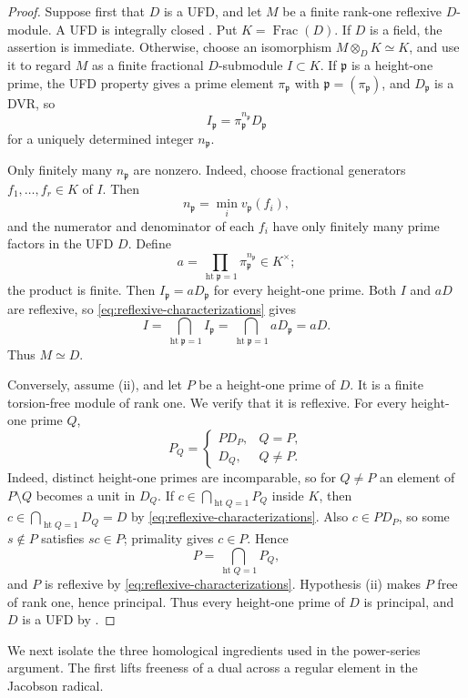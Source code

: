 \documentclass[reqno]{amsart}
\theoremstyle{plain}
\theoremstyle{definition}
\newcommand{\Frac}{\operatorname{Frac}}
\newcommand{\htp}{\operatorname{ht}}
\begin{document}
\begin{proof}
Suppose first that $D$ is a UFD, and let $M$ be a finite rank-one reflexive
$D$-module.  A UFD is integrally closed
\cite[p.~63]{AtiyahMacdonald}.  Put $K=\Frac(D)$.  If $D$ is a field, the
assertion is immediate.  Otherwise, choose
an isomorphism $M\otimes_DK\simeq K$, and use it
to regard $M$ as a finite fractional $D$-submodule $I\subset K$.  If
$\mathfrak p$ is a height-one prime, the UFD property gives a prime element
$\pi_{\mathfrak p}$ with $\mathfrak p=(\pi_{\mathfrak p})$, and
$D_{\mathfrak p}$ is a DVR, so
\[
  I_{\mathfrak p}
  =\pi_{\mathfrak p}^{n_{\mathfrak p}}D_{\mathfrak p}
\]
for a uniquely determined integer $n_{\mathfrak p}$.

Only finitely many $n_{\mathfrak p}$ are nonzero.  Indeed, choose fractional
generators $f_1,\ldots,f_r\in K$ of $I$.  Then
\[
  n_{\mathfrak p}=\min_i v_{\mathfrak p}(f_i),
\]
and the numerator and denominator of each $f_i$ have only finitely many
prime factors in the UFD $D$.  Define
\[
  a=\prod_{\htp\mathfrak p=1}
       \pi_{\mathfrak p}^{n_{\mathfrak p}}\in K^\times;
\]
the product is finite.  Then $I_{\mathfrak p}=aD_{\mathfrak p}$ for every
height-one prime.  Both $I$ and $aD$ are reflexive, so
\eqref{eq:reflexive-characterizations} gives
\[
 I=\bigcap_{\htp\mathfrak p=1}I_{\mathfrak p}
  =\bigcap_{\htp\mathfrak p=1}aD_{\mathfrak p}
  =aD.
\]
Thus $M\simeq D$.

Conversely, assume (ii), and let $P$ be a height-one prime of $D$.  It is a
finite torsion-free module of rank one.  We verify that it is reflexive.
For every height-one prime $Q$,
\[
 P_Q=
 \begin{cases}
   PD_P,&Q=P,\\
   D_Q,&Q\neq P.
 \end{cases}
\]
Indeed, distinct height-one primes are incomparable, so for $Q\neq P$ an
element of $P\setminus Q$ becomes a unit in $D_Q$.  If
$c\in\bigcap_{\htp Q=1}P_Q$ inside $K$, then
$c\in\bigcap_{\htp Q=1}D_Q=D$ by
\eqref{eq:reflexive-characterizations}.  Also $c\in PD_P$, so some
$s\notin P$ satisfies $sc\in P$; primality gives $c\in P$.  Hence
\[
  P=\bigcap_{\htp Q=1}P_Q,
\]
and $P$ is reflexive by \eqref{eq:reflexive-characterizations}.  Hypothesis
(ii) makes $P$ free of rank one, hence principal.  Thus every height-one
prime of $D$ is principal, and $D$ is a UFD by
\cite[Theorem~47, p.~141]{MatsumuraCA}.
\end{proof}

We next isolate the three homological ingredients used in the power-series
argument.  The first lifts freeness of a dual across a regular element in the
Jacobson radical.
\end{document}
